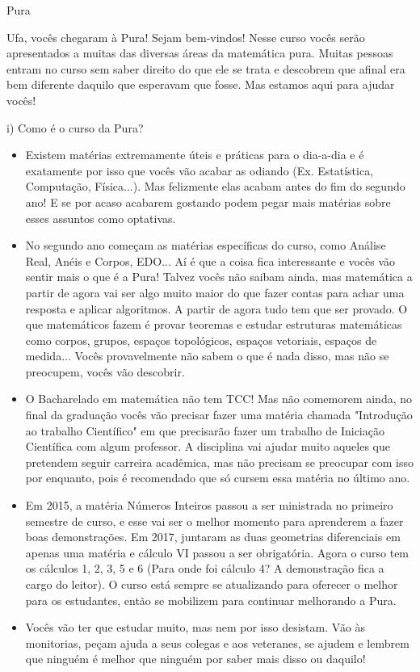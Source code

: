 \begin{subsecao}{Pura}


Ufa, vocês chegaram à Pura! Sejam bem-vindos! Nesse curso vocês serão apresentados a
muitas das diversas áreas da matemática pura. Muitas pessoas entram no curso
sem saber direito do que ele se trata e descobrem que afinal era bem diferente
daquilo que esperavam que fosse. Mas estamos aqui para ajudar vocês!

i) Como é o curso da Pura?

\begin{itemize}

\item  Existem matérias extremamente úteis e práticas para o dia-a-dia e é
exatamente por isso que vocês vão acabar as odiando (Ex. Estatística,
Computação, Física...). Mas felizmente elas acabam antes do fim do segundo ano!
E se por acaso acabarem gostando podem pegar mais matérias sobre esses assuntos
como optativas.
\item No segundo ano começam as matérias específicas do curso, como Análise Real,
Anéis e Corpos, EDO... Aí é que a coisa fica interessante e vocês vão sentir
mais o que é a Pura! Talvez vocês não saibam ainda, mas matemática a partir de
agora vai ser algo muito maior do que fazer contas para achar uma resposta e aplicar
algoritmos. A partir de agora tudo tem que ser provado. O que matemáticos
fazem é provar teoremas e estudar estruturas matemáticas como corpos, grupos,
espaços topológicos, espaços vetoriais, espaços de medida... Vocês provavelmente
não sabem o que é nada disso, mas não se preocupem, vocês vão descobrir.
\item O Bacharelado em matemática não tem TCC! Mas não comemorem ainda, no final da
graduação vocês vão precisar fazer uma matéria chamada "Introdução ao trabalho Científico"
em que precisarão fazer um trabalho de Iniciação Científica com algum professor. A
disciplina vai ajudar muito aqueles que pretendem seguir carreira acadêmica, mas não
precisam se preocupar com isso por enquanto, pois é recomendado que só cursem essa
matéria no último ano.
\item Em 2015, a matéria Números Inteiros passou a ser ministrada no primeiro
semestre de curso, e esse vai ser o melhor momento para aprenderem a fazer boas
demonstrações. Em 2017, juntaram as duas geometrias diferenciais em apenas uma
matéria e cálculo VI passou a ser obrigatória. Agora o curso tem os cálculos 1, 2, 3,
5 e 6 (Para onde foi cálculo 4? A demonstração fica a cargo do leitor).
O curso está sempre se atualizando para oferecer o melhor para os estudantes,
então se mobilizem para continuar melhorando a Pura.
\item  Vocês vão ter que estudar muito, mas nem por isso desistam. Vão às monitorias,
peçam ajuda a seus colegas e aos veteranes, se ajudem e lembrem que ninguém é melhor 
que ninguém por saber mais disso ou daquilo!


\end{itemize}
\end{subsecao}
